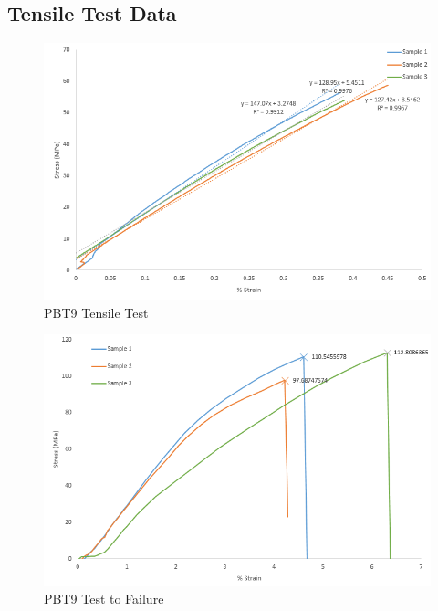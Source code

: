 \documentclass[11pt]{article}
\begin{document}
\begin{appendices}
\newpage
\vspace*{\fill}
\begin{center}
\section{Tensile Test Data}
\end{center}
\vspace*{\fill}
\newpage

\begin{figure}[H]
\centering
\includegraphics[width=.95\linewidth]{figures/PBT9_Tensile.png}
\caption{PBT9 Tensile Test}
\label{pbt9tensile}
\end{figure}

\begin{figure}[H]
\centering
\includegraphics[width=.95\linewidth]{figures/PBT9_Fail.png}
\caption{PBT9 Test to Failure}
\label{pbt9fail}
\end{figure}


\end{appendices}
\end{document}
